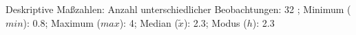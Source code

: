 				\label{tableValues:adem04}
				\vspace*{-\baselineskip}
                    \begin{noten}
                	    \note{} Deskriptive Maßzahlen:
                	    Anzahl unterschiedlicher Beobachtungen: 32%
                	    ; 
                	      Minimum ($min$): 0.8; 
                	      Maximum ($max$): 4; 
                	      Median ($\tilde{x}$): 2.3; 
                	      Modus ($h$): 2.3
                     \end{noten}

